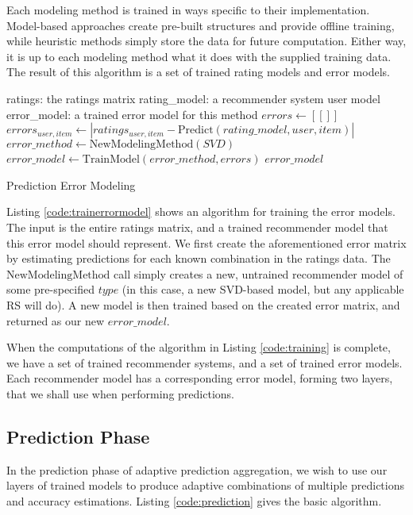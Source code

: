 Each modeling method is trained in ways specific to their implementation. 
Model-based approaches create pre-built structures and provide offline training,
while heuristic methods simply store the data for future computation.
Either way, it is up to each modeling method what it does with the supplied training data.
The result of this algorithm is a set of trained rating models and error models.

\begin{algorithm}
  \begin{algorithmic}[1]
  \REQUIRE ratings: the ratings matrix
  \REQUIRE rating\_model: a recommender system user model
  \ENSURE error\_model: a trained error model for this method
    \STATE $errors \gets [[]]$
        \STATE $errors_{user,item} \gets | ratings_{user,item} - \mathrm{Predict}(rating\_model, user, item) |$
    \ENDFOR 
    \STATE $error\_method \gets \mathrm{NewModelingMethod}(SVD)$
    \STATE $error\_model  \gets \mathrm{TrainModel}(error\_method, errors)$
  \RETURN $error\_model$
  \end{algorithmic}
  \caption[Prediction Error Modeling]{Prediction Error Modeling}
  \label{code:trainerrormodel}
\end{algorithm}

Listing \ref{code:trainerrormodel} shows an algorithm for training the error models.
The input is the entire ratings matrix, and a trained recommender model
that this error model should represent.
We first create the aforementioned error matrix by estimating
predictions for each known combination in the ratings data.
The $\mathrm{NewModelingMethod}$ call simply creates a new, untrained
recommender model of some pre-specified $type$
(in this case, a new SVD-based model, but any applicable RS will do).
A new model is then trained based on the created error matrix,
and returned as our new $error\_model$.

When the computations of the algorithm in Listing \ref{code:training} is complete,
we have a set of trained recommender systems, and a set of trained error models.
Each recommender model has a corresponding error model,
forming two layers, that we shall use when performing predictions.


\subsection{Prediction Phase}

In the prediction phase of adaptive prediction aggregation,
we wish to use our layers of trained models to produce adaptive
combinations of multiple predictions and accuracy estimations.
Listing \ref{code:prediction} gives the basic algorithm.

